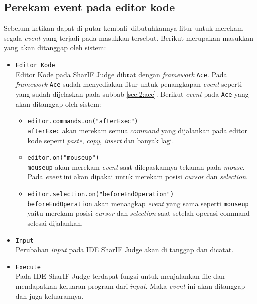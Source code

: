 \subsection{Perekam event pada editor kode}
\label{sub:3:2:rekam}

Sebelum ketikan dapat di putar kembali, dibutuhkannya fitur untuk merekam segala \textit{event} yang terjadi pada masukkan tersebut. Berikut merupakan masukkan yang akan ditanggap oleh sistem:

\begin{itemize}
	\item \verb|Editor Kode| \\
	      Editor Kode pada SharIF Judge dibuat dengan \textit{framework} \verb|Ace|. Pada \textit{framework} \verb|Ace| sudah menyediakan fitur untuk penangkapan \textit{event} seperti yang sudah dijelaskan pada subbab \ref{sec:2:ace}. Berikut \textit{event} pada \verb|Ace| yang akan ditanggap oleh sistem:

	      \begin{itemize}
		      \item \verb|editor.commands.on("afterExec")| \\
		            \verb|afterExec| akan merekam semua \textit{command} yang dijalankan pada editor kode seperti \textit{paste}, \textit{copy}, \textit{insert} dan banyak lagi.
		      \item \verb|editor.on("mouseup")| \\
		            \verb|mouseup| akan merekam \textit{event} saat dilepaskannya tekanan pada \textit{mouse}. Pada \textit{event} ini akan dipakai untuk merekam posisi \textit{cursor} dan \textit{selection}.
		      \item \verb|editor.selection.on("beforeEndOperation")| \\
		            \verb|beforeEndOperation| akan menangkap \textit{event} yang sama seperti \verb|mouseup| yaitu merekam posisi \textit{cursor} dan \textit{selection} saat setelah operasi command selesai dijalankan.
	      \end{itemize}

	\item \verb|Input| \\
	      Perubahan \textit{input} pada IDE SharIF Judge akan di tanggap dan dicatat.
	\item \verb|Execute| \\
	      Pada IDE SharIF Judge terdapat fungsi untuk menjalankan file dan mendapatkan keluaran program dari \textit{input}. Maka \textit{event} ini akan ditanggap dan juga keluarannya.
\end{itemize}

